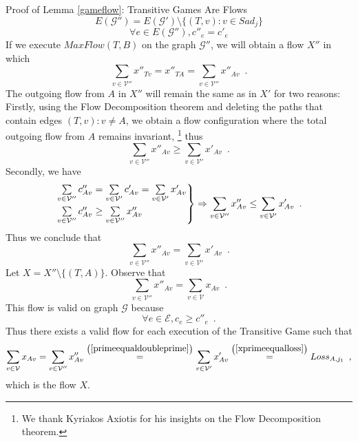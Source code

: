 \begin{sepproof}{Proof of Lemma \ref{gameflow}: Transitive Games Are Flows}
  \begin{equation*}
    E(\mathcal{G}'') = E(\mathcal{G}') \setminus \{(T, v) : v \in Sad_j\}
  \end{equation*}
  \begin{equation*}
    \forall e \in E(\mathcal{G}''), c''_e = c'_e
  \end{equation*}
  If we execute $MaxFlow(T, B)$ on the graph $\mathcal{G}''$, we will obtain a flow $X''$ in which
  \begin{equation*}
    \sum\limits_{v \in \mathcal{V}''}x''_{Tv} = x''_{TA} = \sum\limits_{v \in \mathcal{V}''}x''_{Av} \enspace.
  \end{equation*}
  The outgoing flow from $A$ in $X''$ will remain the same as in $X'$ for two reasons: Firstly, using the Flow
  Decomposition theorem \cite{amo} and deleting the paths that contain edges $\left(T, v\right): v \neq A$, we
  obtain a flow configuration where the total outgoing flow from $A$ remains invariant,
     \footnote{We thank Kyriakos Axiotis for his insights on the Flow Decomposition theorem.}
  thus
  \begin{equation*}
    \sum\limits_{v \in \mathcal{V}''}x''_{Av} \geq \sum\limits_{v \in \mathcal{V}'}x'_{Av} \enspace.
  \end{equation*}
  Secondly, we have
  \begin{equation*}
    \begin{rcases}
      \sum\limits_{v \in \mathcal{V}''}c''_{Av} = \sum\limits_{v \in \mathcal{V}'}c'_{Av} = \sum\limits_{v \in
      \mathcal{V}'}x'_{Av} \\
      \sum\limits_{v \in \mathcal{V}''}c''_{Av} \geq \sum\limits_{v \in \mathcal{V}''}x''_{Av}
    \end{rcases}
    \Rightarrow \sum\limits_{v \in \mathcal{V}''}x''_{Av} \leq \sum\limits_{v \in \mathcal{V}'}x'_{Av} \enspace.
  \end{equation*}
  Thus we conclude that
  \begin{equation}
  \label{primeequaldoubleprime}
    \sum\limits_{v \in \mathcal{V}''}x''_{Av} = \sum\limits_{v \in \mathcal{V}'}x'_{Av} \enspace.
  \end{equation}
  Let $X = X'' \setminus \{(T, A)\}$. Observe that
  \begin{equation*}
    \sum\limits_{v \in \mathcal{V}''}x''_{Av} = \sum\limits_{v \in \mathcal{V}}x_{Av} \enspace.
  \end{equation*}
  This flow is valid on graph $\mathcal{G}$ because
  \begin{equation*}
    \forall e \in \mathcal{E}, c_e \geq c''_e \enspace.
  \end{equation*}
  Thus there exists a valid flow for each execution of the Transitive Game such that
  \begin{equation*}
    \sum\limits_{v \in \mathcal{V}}x_{Av} = \sum\limits_{v \in \mathcal{V}''}x''_{Av}
    \overset{\left(\ref{primeequaldoubleprime}\right)}{=} \sum\limits_{v \in \mathcal{V}'}x'_{Av}
    \overset{\left(\ref{xprimeequalloss}\right)}{=} Loss_{A, j_1} \enspace,
  \end{equation*}
  which is the flow $X$.
\end{sepproof}
